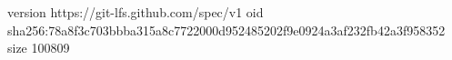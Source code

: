 version https://git-lfs.github.com/spec/v1
oid sha256:78a8f3c703bbba315a8c7722000d952485202f9e0924a3af232fb42a3f958352
size 100809

